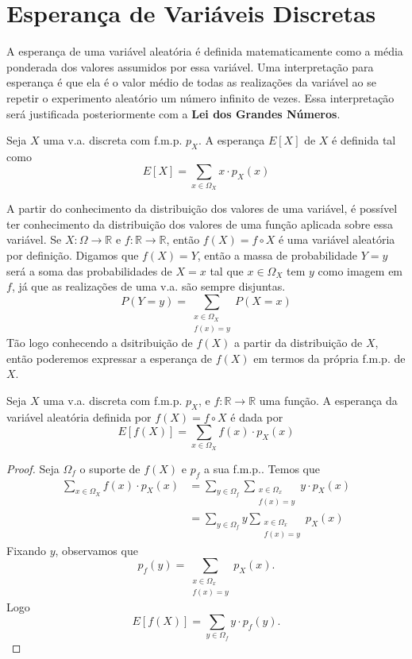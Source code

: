 \section{Esperança de Variáveis Discretas}

A esperança de uma variável aleatória é definida matematicamente como a média ponderada
dos valores assumidos por essa variável. Uma interpretação para esperança é que ela é
o valor médio de todas as realizações da variável ao se repetir o experimento aleatório
um número infinito de vezes. Essa interpretação será justificada posteriormente com
a \textbf{Lei dos Grandes Números}.

\begin{def:esperanca discreta}
Seja $X$ uma v.a. discreta com f.m.p. $p_X$. A esperança $E[X]$ de $X$ é definida tal como
\[
	E[X] = \sum_{x \in \Omega_X} x \cdot p_X(x)
\]
\end{def:esperanca discreta}

A partir do conhecimento da distribuição dos valores de uma variável, é possível ter
conhecimento da distribuição dos valores de uma função aplicada sobre essa variável.
Se $X: \Omega \to \mathbb{R}$ e $f: \mathbb{R} \to \mathbb{R}$, então $f(X) = f \circ X$
é uma variável aleatória por definição. Digamos que $f(X) = Y$, então a massa de
probabilidade $Y = y$ será a soma das probabilidades de $X = x$ tal que $x \in \Omega_X$
tem $y$ como imagem em $f$, já que as realizações de uma v.a. são sempre disjuntas.
\[
	P(Y = y) = \sum_{\substack{x \in \Omega_X \\ f(x) = y}} P(X = x)
\]
\noindent
Tão logo conhecendo a dsitribuição de $f(X)$ a partir da distribuição de $X$, então poderemos
expressar a esperança de $f(X)$ em termos da própria f.m.p. de $X$.

\begin{prop:esperanca de funcao}
Seja $X$ uma v.a. discreta com f.m.p. $p_X$, e $f: \mathbb{R} \to \mathbb{R}$
uma função. A esperança da variável aleatória definida por $f(X) = f \circ X$ é
dada por
\[
	E[f(X)] = \sum_{x \in \Omega_X} f(x) \cdot p_X(x)
\]
\begin{proof}
	Seja $\Omega_f$ o suporte de $f(X)$ e $p_f$ a sua f.m.p.. Temos que
	\begin{align*}
		\sum_{x \in \Omega_X} f(x) \cdot p_X(x) & = \sum_{y \in \Omega_f} \sum_{\substack{x \in \Omega_x   \\ f(x) = y}} y \cdot p_X(x)\\
		                                        & = \sum_{y \in \Omega_f} y \sum_{\substack{x \in \Omega_x \\ f(x) = y}} p_X(x)
	\end{align*}
	Fixando $y$, observamos que
	\[
		p_f(y) = \sum_{\substack{x \in \Omega_x \\ f(x) = y}} p_X(x).
	\]
	Logo
	\[
		E[f(X)] = \sum_{y \in \Omega_f} y \cdot p_f(y).
	\]
\end{proof}
\end{prop:esperanca de funcao}

